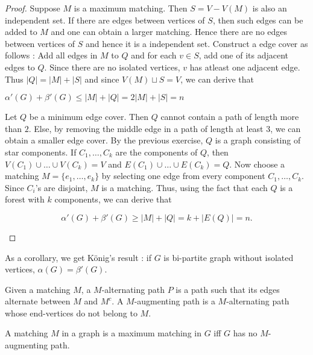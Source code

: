 \documentclass[../basic_graph_theory.tex]{subfiles}
\begin{document}
\begin{proof}
    Suppose $M$ is a maximum matching. Then $S = V - V(M)$ is also an independent set. If there are edges between vertices of $S$, then such edges can be added to $M$ and one can obtain a larger matching. Hence there are no edges between vertices of $S$ and hence it is a independent set. Construct a edge cover as follows : Add all edges in $M$ to $Q$ and for each $v \in S$, add one of its adjacent edges to $Q$.  Since there are no isolated vertices,  $v$ has atleast one adjacent edge.  Thus $|Q| = |M| + |S|$ and since $V(M) \sqcup S = V$, we can derive that\\
    \begin{center}
    $\alpha'(G) + \beta'(G) \leq |M| + |Q| = 2|M| + |S| = n$
    \end{center}
    Let $Q$ be a minimum edge cover. Then $Q$ cannot contain a path of length more than $2$. Else, by removing the middle edge in a path of length at least 3, we can obtain a smaller edge cover. By the previous exercise, $Q$ is a graph consisting of star components. If $C_1,\ldots,C_k$ are the components of $Q$, then $V(C_1) \cup \ldots \cup V(C_k) = V$ and $E(C_1) \cup \ldots \cup E(C_k) = Q$. Now choose a matching $M = \{e_1,\ldots,e_k\}$ by selecting one edge from every component $C_1,\ldots,C_k$.  Since $C_i$'s are disjoint, $M$ is a matching. Thus, using the fact that each $Q$ is a forest with $k$ components, we can derive that\\
    \begin{center}
    $$ \alpha'(G) + \beta'(G)  \geq |M| + |Q| = k + |E(Q)| = n.$$
    \end{center}
\end{proof}
As a corollary, we get K\"{o}nig's result : if $G$ is bi-partite graph without isolated vertices, $\alpha(G) = \beta'(G)$. 
\begin{defn}
    Given a matching $M$, a $M$-alternating path $P$ is a path such that its edges alternate between $M$ and $M^c$.  A $M$-augmenting path is a $M$-alternating path whose end-vertices do not belong to $M$. 
\end{defn}
\begin{thm}
        A matching $M$ in a graph is a maximum matching in $G$ iff $G$ has no $M$-augmenting path.
\end{thm}
\end{document}
